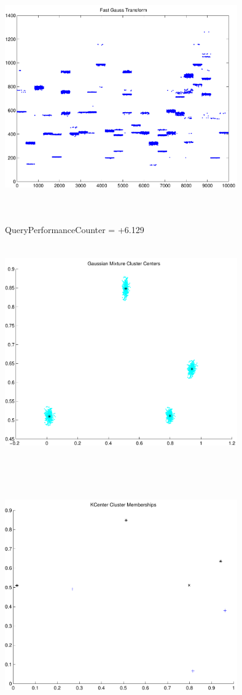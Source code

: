 \documentclass[9pt]{article}
\theoremstyle{plain}
\theoremstyle{definition}
\theoremstyle{remark}
\numberwithin{equation}{section}
\begin{document}
\includegraphics[width=10.0cm,height=10.0cm]{FGT24_Centers.pdf}

QueryPerformanceCounter  =  +6.129
\includegraphics[width=10.0cm,height=10.0cm]{GaussianMixture_ClusterCenters4_Centers.pdf}

\includegraphics[width=10.0cm,height=10.0cm]{KCenterClusterMemberships_4_Centers.pdf}
\end{document}

